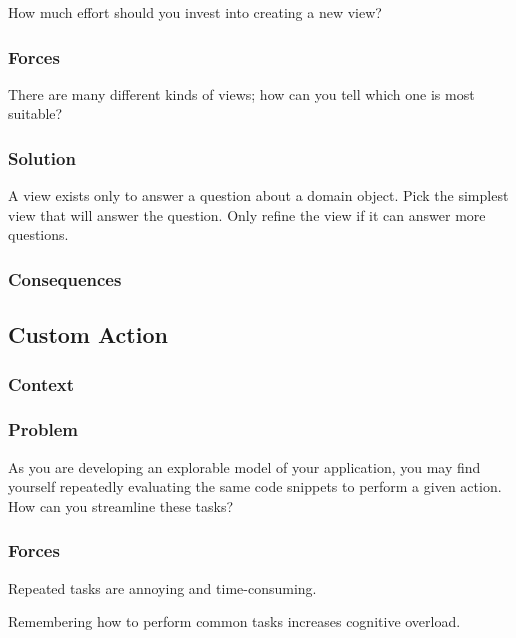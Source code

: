 \documentclass[sigconf]{acmart}
\begin{document}
How much effort should you invest into creating a new view?

\subsubsection*{Forces}

There are many different kinds of views; how can you tell which one is most suitable?

\subsubsection*{Solution}

A view exists only to answer a question about a domain object. Pick the simplest view that will answer the question. Only refine the view if it can answer more questions.


\subsubsection*{Consequences}

\subsection*{Custom Action}\label{pat:customAction}
\subsubsection*{Context}
\subsubsection*{Problem}

As you are developing an explorable model of your application, you may find yourself repeatedly evaluating the same code snippets to perform a given action. How can you streamline these tasks?

\subsubsection*{Forces}

Repeated tasks are annoying and time-consuming.

Remembering how to perform common tasks increases cognitive overload.
\end{document}
